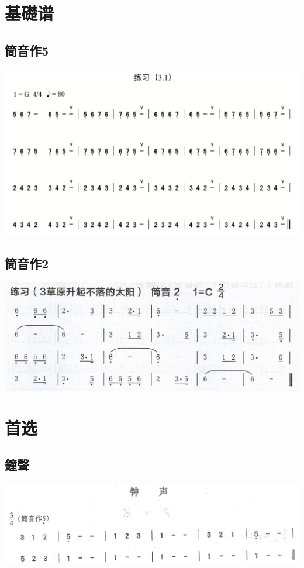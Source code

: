 \documentclass[cn,pad,twocol]{elegantbook}
\begin{document}
\chapter{基礎谱}
\section{筒音作5}
\begin{center}
	\includegraphics[width=\textwidth]{dongxiao/20200419-练习3.1.png}
\end{center}
\section{筒音作2}
	\includegraphics[width=\textwidth]{dongxiao/Scan 6.jpeg}

\chapter{首选}
\section{鐘聲}                  \includegraphics[width=\textwidth]{dongxiao/20200711-钟声.jpg}
\end{document}

